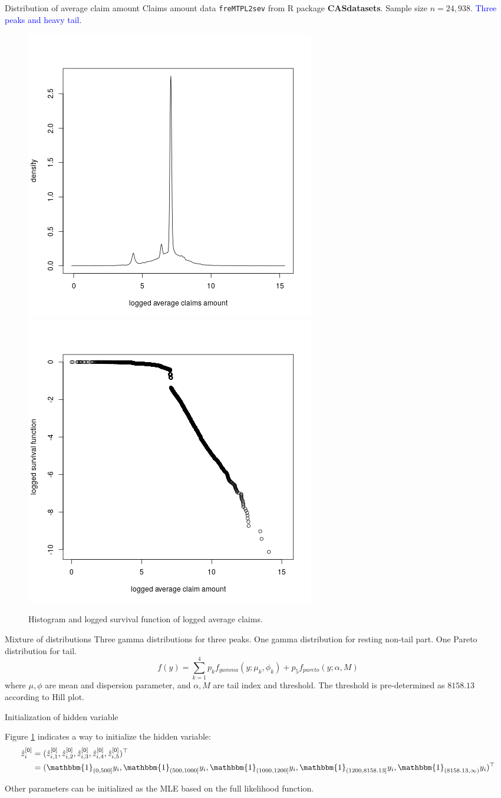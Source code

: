 \documentclass[11pt]{article}
\numberwithin{equation}{section}
\newcommand{\blue}[1]{\textcolor{blue}{#1}}
\begin{document}
\begin{frame}{Distribution of average claim amount}
	Claims amount data {\tt freMTPL2sev} from R package {\bf CASdatasets}. Sample size $n=24,938$. \blue{Three peaks and heavy tail}.
	\begin{figure}[h!]
		\centering
		\includegraphics[width=0.35\linewidth]{../plots/sev/hist.png}
		\includegraphics[width=0.35\linewidth]{../plots/sev/log-log.png}
		\caption{Histogram and logged survival function of logged average claims.}\label{tail}
	\end{figure}
\end{frame}

\begin{frame}{Mixture of distributions}
	Three gamma distributions for three peaks. One gamma distribution for resting non-tail part. One Pareto distribution for tail.
	$$f(y)=\sum_{k=1}^4p_kf_{gamma}(y;\mu_k,\phi_k)+p_5f_{pareto}(y;\alpha,M)$$
	where $\mu,\phi$ are mean and dispersion parameter, and $\alpha, M$ are tail index and threshold. The threshold is pre-determined as $8158.13$ according to Hill plot.
\end{frame}

\begin{frame}{Initialization of hidden variable}
	
	Figure \ref{tail} indicates a way to initialize the hidden variable:
	\begin{equation}
		\begin{aligned}
			\hat{z}^{[0]}_i&=(\hat{z}^{[0]}_{i,1},\hat{z}^{[0]}_{i,2},\hat{z}^{[0]}_{i,3},\hat{z}^{[0]}_{i,4},\hat{z}^{[0]}_{i,5})^\top\\
			&=(\mathbbm{1}_{(0,500]}y_i,\mathbbm{1}_{(500, 1000]}y_i,\mathbbm{1}_{(1000,1200]}y_i,\mathbbm{1}_{(1200,8158.13]}y_i,\mathbbm{1}_{(8158.13,\infty)}y_i)^\top
		\end{aligned}
	\end{equation}
	
	Other parameters can be initialized as the MLE based on the full likelihood function.
	
\end{frame}
\end{document}
